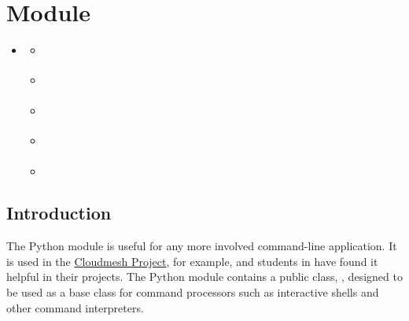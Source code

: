 \section{ Module}
\label{\detokenize{lesson/prg/python_cmd:cmd-module}}\label{\detokenize{lesson/prg/python_cmd::doc}}
\begin{sphinxShadowBox}
\begin{itemize}
\item {} 
\label{\detokenize{lesson/prg/python_cmd:id1}}{\hyperref[\detokenize{lesson/prg/python_cmd:cmd-module}]{}}
\begin{itemize}
\item {} 
\label{\detokenize{lesson/prg/python_cmd:id2}}{\hyperref[\detokenize{lesson/prg/python_cmd:introduction}]{}}

\item {} 
\label{\detokenize{lesson/prg/python_cmd:id3}}{\hyperref[\detokenize{lesson/prg/python_cmd:hello-world-with-cmd}]{}}

\item {} 
\label{\detokenize{lesson/prg/python_cmd:id4}}{\hyperref[\detokenize{lesson/prg/python_cmd:a-more-involved-example}]{}}

\item {} 
\label{\detokenize{lesson/prg/python_cmd:id5}}{\hyperref[\detokenize{lesson/prg/python_cmd:help-messages}]{}}

\item {} 
\label{\detokenize{lesson/prg/python_cmd:id6}}{\hyperref[\detokenize{lesson/prg/python_cmd:useful-links}]{}}

\end{itemize}

\end{itemize}
\end{sphinxShadowBox}


\subsection{Introduction}
\label{\detokenize{lesson/prg/python_cmd:introduction}}
The Python  module is useful for any more involved command-line
application. It is used in the \href{http://cloudmesh.github.io/}{Cloudmesh Project}, for example, and students in {\hyperref[\detokenize{i524/index::doc}]{}} have found it helpful in their projects.  The
Python  module contains a public class, , designed to be
used as a base class for command processors such as interactive shells
and other command interpreters.


